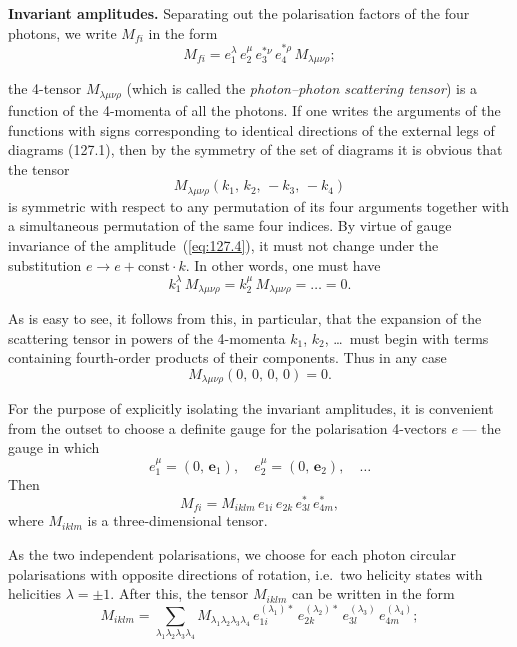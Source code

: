 \textbf{Invariant amplitudes.} Separating out the polarisation factors of the four photons, we write $M_{fi}$ in the form
\begin{equation}
M_{fi} = e_1^\lambda\, e_2^\mu\, e_3^{*\nu}\, e_4^{*\rho}\, M_{\lambda\mu\nu\rho};
\label{eq:127.4}
\end{equation}


\noindent the 4-tensor $M_{\lambda\mu\nu\rho}$ (which is called the \emph{photon--photon scattering tensor}) is a function of the 4-momenta of all the photons. If one writes the arguments of the functions with signs corresponding to identical directions of the external legs of diagrams (127.1), then by the symmetry of the set of diagrams it is obvious that the tensor
\[
M_{\lambda\mu\nu\rho}(k_1,\,k_2,\,-k_3,\,-k_4)
\]
is symmetric with respect to any permutation of its four arguments together with a simultaneous permutation of the same four indices. By virtue of gauge invariance of the amplitude~(\ref{eq:127.4}), it must not change under the substitution $e \to e + \mathrm{const}\cdot k$. In other words, one must have
\begin{equation}
k_1^\lambda\, M_{\lambda\mu\nu\rho} = k_2^\mu\, M_{\lambda\mu\nu\rho} = \dots = 0.
\label{eq:127.5}
\end{equation}

As is easy to see, it follows from this, in particular, that the expansion of the scattering tensor in powers of the 4-momenta $k_1$, $k_2$, \dots\ must begin with terms containing fourth-order products of their components. Thus in any case
\begin{equation}
M_{\lambda\mu\nu\rho}(0,\,0,\,0,\,0) = 0.
\label{eq:127.6}
\end{equation}

For the purpose of explicitly isolating the invariant amplitudes, it is convenient from the outset to choose a definite gauge for the polarisation 4-vectors $e$ --- the gauge in which
\begin{equation}
e_1^\mu = (0,\,\mathbf{e}_1), \quad e_2^\mu = (0,\,\mathbf{e}_2), \quad \dots
\label{eq:127.7}
\end{equation}
Then
\begin{equation}
M_{fi} = M_{iklm}\, e_{1i}\, e_{2k}\, e_{3l}^*\, e_{4m}^*,
\label{eq:127.8}
\end{equation}
where $M_{iklm}$ is a three-dimensional tensor.

As the two independent polarisations, we choose for each photon circular polarisations with opposite directions of rotation, i.e.\ two helicity states with helicities $\lambda = \pm 1$. After this, the tensor $M_{iklm}$ can be written in the form
\begin{equation}
M_{iklm} = \sum_{\lambda_1 \lambda_2 \lambda_3 \lambda_4} M_{\lambda_1 \lambda_2 \lambda_3 \lambda_4}\, e_{1i}^{(\lambda_1)*}\, e_{2k}^{(\lambda_2)*}\, e_{3l}^{(\lambda_3)}\, e_{4m}^{(\lambda_4)};
\label{eq:127.9}
\end{equation}

